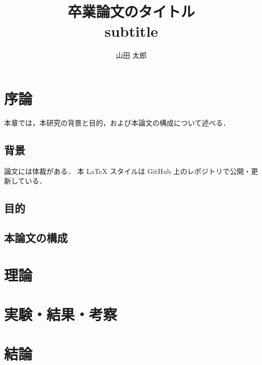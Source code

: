 \documentclass[a4paper,dvipdfmx,12pt]{jsarticle}
\title{卒業論文のタイトル\\subtitle}
\author{山田 太郎}
\begin{document}
\maketitle

\section{序論}
本章では，本研究の背景と目的，および本論文の構成について述べる．
\subsection{背景}
論文には体裁がある．
本 LaTeX スタイルは GitHub 上のレポジトリ\cite{miino2023github}で公開・更新している．

\subsection{目的}

\subsection{本論文の構成}

\newpage
\section{理論}

\clearpage
\section{実験・結果・考察}

\newpage
\section{結論}


\end{document}
